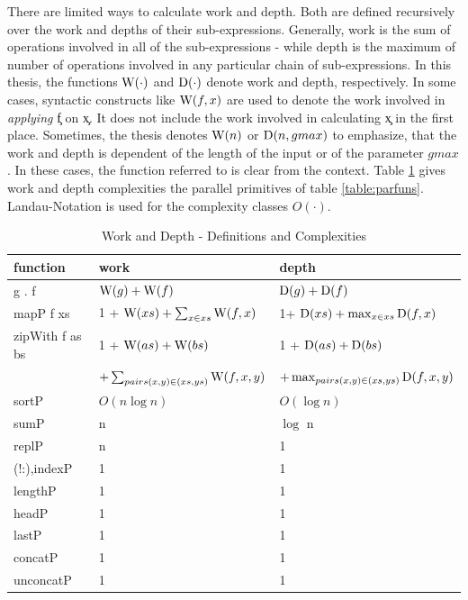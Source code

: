   There are limited ways to calculate work and depth. Both are defined
  recursively over the work and depths of their sub-expressions. Generally,
  work is the sum of operations involved in all of the sub-expressions
  - while depth is the maximum of number of operations involved in
  any particular chain of sub-expressions.
  In this thesis, the functions $\textrm{W}(\cdot)$ and $\textrm{D}(\cdot)$ denote work
  and depth, respectively. In some cases, syntactic constructs
  like $\textrm{W}(f,x)$ are used to denote the work involved in \emph{applying}
  \c{f} on \c{x}. It does not include the work involved
  in calculating \c{x} in the first place. Sometimes,
  the thesis denotes $\textrm{W}(n)$ or $\textrm{D}(n,gmax)$ to emphasize,
  that the work and depth is dependent of the length of the input
  or of the parameter $gmax$. In these cases, the function referred to
  is clear from the context.
  Table \ref{table:workdepth} gives work and depth complexities the parallel primitives
  of table \ref{table:parfuns}. Landau-Notation is used for
  the complexity classes $O(\cdot)$.
  
  \begin{table}[h]
    \caption{Work and Depth - Definitions and Complexities}
    \label{table:workdepth}
    \begin{center}
    \begin{tabular}{lll}
      \toprule
      function & work & depth \\
      \midrule
      g . f & $\textrm{W}(g) + \textrm{W}(f)$ & $\textrm{D}(g) + \textrm{D}(f)$ \\
      mapP f xs & 1 + $\textrm{W}(xs) + \sum_{x \in xs}\textrm{W}(f,x)$ & 1+ $\textrm{D}(xs) + \max_{x \in xs}\textrm{D}(f,x)$ \\
      zipWith f as bs & 1 + $\textrm{W}(as) + \textrm{W}(bs)$ & 1 + $\textrm{D}(as) + \textrm{D}(bs)$ \\
        & $+ \sum_{pairs (x,y) \in (xs,ys)}\textrm{W}(f,x,y)$ & $ + \max_{pairs (x,y) \in (xs,ys)}\textrm{D}(f,x,y)$ \\
      sortP & $O(n \log n)$ & $O(\log n)$ \\
      sumP & n & $\log$ n \\
      replP &  n & 1 \\
      (!:),indexP & 1 & 1 \\
      lengthP & 1 & 1 \\
      headP & 1 & 1 \\
      lastP & 1 & 1 \\
      concatP & 1 & 1 \\
      unconcatP & 1 & 1 \\
    \end{tabular}
    \end{center}
  \end{table}
  
